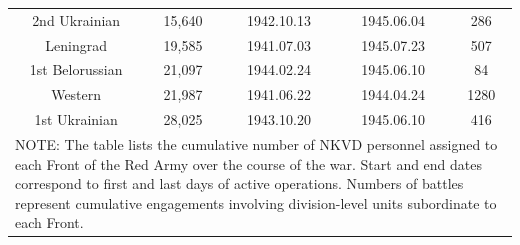 \begin{table}[ht]
\begin{tabular}{p{2.5cm}p{3.5cm}p{1.75cm}p{1.75cm}p{1.75cm}}
  \multicolumn{1}{c}{2nd Ukrainian} & \multicolumn{1}{c}{15,640} & \multicolumn{1}{c}{1942.10.13} & \multicolumn{1}{c}{1945.06.04} & \multicolumn{1}{c}{286} \\ 
  \multicolumn{1}{c}{Leningrad} & \multicolumn{1}{c}{19,585} & \multicolumn{1}{c}{1941.07.03} & \multicolumn{1}{c}{1945.07.23} & \multicolumn{1}{c}{507} \\ 
  \multicolumn{1}{c}{1st Belorussian} & \multicolumn{1}{c}{21,097} & \multicolumn{1}{c}{1944.02.24} & \multicolumn{1}{c}{1945.06.10} & \multicolumn{1}{c}{84} \\ 
  \multicolumn{1}{c}{Western} & \multicolumn{1}{c}{21,987} & \multicolumn{1}{c}{1941.06.22} & \multicolumn{1}{c}{1944.04.24} & \multicolumn{1}{c}{1280} \\ 
  \multicolumn{1}{c}{1st Ukrainian} & \multicolumn{1}{c}{28,025} & \multicolumn{1}{c}{1943.10.20} & \multicolumn{1}{c}{1945.06.10} & \multicolumn{1}{c}{416} \\ 
   \bottomrule 
\multicolumn{5}{p{5in}}{{\footnotesize NOTE: The table lists the cumulative number of NKVD personnel assigned to each Front of the Red Army over the course of the war. Start and end dates correspond to first and last days of active operations. Numbers of battles represent cumulative engagements involving division-level units subordinate to each Front.
}}\\ \end{tabular}\endgroup
\end{table}

